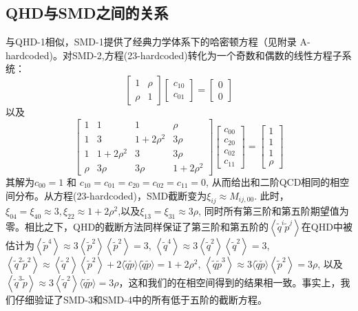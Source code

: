 \subsection{QHD与SMD之间的关系}
与QHD-1相似，SMD-1提供了经典力学体系下的哈密顿方程（见附录 A-hardcoded)。对SMD-2,方程(23-hardcoded)转化为一个奇数和偶数的线性方程子系统：
\begin{equation}
	\left[\begin{array}{ll}
{1} & {\rho} \\
{\rho} & {1}
\end{array}\right]\left[\begin{array}{l}
{c_{10}} \\
{c_{01}}
\end{array}\right]=\left[\begin{array}{l}
{0} \\
{0}
\end{array}\right]
\end{equation}
以及
\begin{equation}
	\left[\begin{array}{cccc}
{1} & {1} & {1} & {\rho} \\
{1} & {3} & {1+2 \rho^{2}} & {3 \rho} \\
{1} & {1+2 \rho^{2}} & {3} & {3 \rho} \\
{\rho} & {3 \rho} & {3 \rho} & {1+2 \rho^{2}}
\end{array}\right]\left[\begin{array}{l}
{c_{00}} \\
{c_{20}} \\
{c_{02}} \\
{c_{11}}
\end{array}\right]=\left[\begin{array}{c}
{1} \\
{1} \\
{1} \\
{\rho}
\end{array}\right]
\end{equation}
其解为$c_{00} = 1$ 和 $c_{10}=c_{01}=c_{20}=c_{02}=c_{11}=0$, 从而给出和二阶QCD相同的相空间分布。从方程(23-hardcoded)，SMD截断变为$\xi_{i j} \approx M_{i j, 00}$. 此时，$\xi_{04}=\xi_{40} \approx 3, \xi_{22} \approx 1+2 \rho^{2}$,以及$\xi_{13}=\xi_{31} \approx 3 \rho$, 同时所有第三阶和第五阶期望值为零。相比之下，QHD的截断方法同样保证了第三阶和第五阶的$\left\langle\tilde{q}^{i} \tilde{p}^{j}\right\rangle$在QHD中被估计为$\left\langle\tilde{p}^{4}\right\rangle \approx 3\left\langle\tilde{p}^{2}\right\rangle\left\langle\tilde{p}^{2}\right\rangle= 3$, $\left\langle\tilde{q}^{4}\right\rangle \approx 3\left\langle\tilde{q}^{2}\right\rangle\left\langle\tilde{q}^{2}\right\rangle= 3$, $\left\langle\tilde{q}^{2} \tilde{p}^{2}\right\rangle \approx\left\langle\tilde{q}^{2}\right\rangle\left\langle\tilde{p}^{2}\right\rangle+ 2\langle\tilde{q} \tilde{p}\rangle\langle\tilde{q} \tilde{p}\rangle= 1+2 \rho^{2}$, $\left\langle\tilde{q} \tilde{p}^{3}\right\rangle \approx 3\langle\tilde{q} \tilde{p}\rangle\left\langle\tilde{p}^{2}\right\rangle = 3 \rho$, 以及$\left\langle\tilde{q}^{3} \tilde{p}\right\rangle \approx 3\left\langle\tilde{q}^{2}\right\rangle\langle\tilde{q} \tilde{p}\rangle= 3 \rho$，这和我们的在相空间得到的结果相一致。事实上，我们仔细验证了SMD-3和SMD-4中的所有低于五阶的截断方程。
